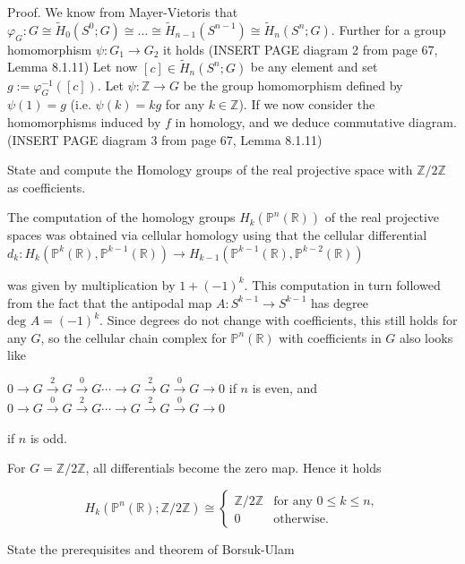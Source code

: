 Proof. 
We know from Mayer-Vietoris that
\(\varphi_G : G \cong \tilde{H}_0(S^0; G) \cong \ldots \cong \tilde{H}_{n-1}(S^{n-1}) \cong \tilde{H}_n(S^n; G).\)
Further for a group homomorphism \(\psi : G_1 \to G_2\) it holds
(INSERT PAGE diagram 2 from page 67, Lemma 8.1.11)
Let now \([c] \in \tilde{H}_n(S^n; G)\) be any element and set \(g := \varphi_{G}^{-1}([c])\). 
Let \(\psi : \mathbb{Z} \to G\) be the group homomorphism defined by \(\psi(1) = g\) (i.e. \(\psi(k) = kg\) for any \(k \in \mathbb{Z}\)). 
If we now consider the homomorphisms induced by \( f \) in homology, and we deduce 
commutative diagram.
(INSERT PAGE diagram 3 from page 67, Lemma 8.1.11)

State and compute the Homology groups of the real projective space with \( \mathbb{Z}/2\mathbb{Z} \) as coefficients.

The computation of the homology groups \(H_k(\mathbb{P}^n(\mathbb{R}))\) of the real projective spaces was obtained 
via cellular homology using that the cellular differential 
\(
d_k : H_k(\mathbb{P}^k(\mathbb{R}), \mathbb{P}^{k-1}(\mathbb{R})) \to H_{k-1}(\mathbb{P}^{k-1}(\mathbb{R}), \mathbb{P}^{k-2}(\mathbb{R}))
\)

was given by multiplication by \( 1 + (-1)^k \). This computation in turn followed from the fact that the antipodal map 
\( A : S^{k-1} \to S^{k-1} \) has degree \(\text{deg } A = (-1)^k\). Since degrees do not change with coefficients, this still holds for any \( G \), 
so the cellular chain complex for \(\mathbb{P}^n(\mathbb{R})\) with coefficients in \( G \) also looks like

\(0 \longrightarrow G \xrightarrow{2} G \xrightarrow{0} G \dotsb \longrightarrow G \xrightarrow{2} G \xrightarrow{0} G \longrightarrow 0\)
if \( n \) is even, and
\(0 \longrightarrow G \xrightarrow{0} G \xrightarrow{2} G \dotsb \longrightarrow G \xrightarrow{2} G \xrightarrow{0} G \longrightarrow 0\)

if \( n \) is odd.

For \(G = \mathbb{Z}/2\mathbb{Z}\), all differentials become the zero map. Hence it holds

\[
H_k(\mathbb{P}^n(\mathbb{R}); \mathbb{Z}/2\mathbb{Z}) \cong 
\begin{cases}
\mathbb{Z}/2\mathbb{Z} & \text{for any } 0 \leq k \leq n, \\
0 & \text{otherwise.}
\end{cases}
\]

State the prerequisites and theorem of Borsuk-Ulam

